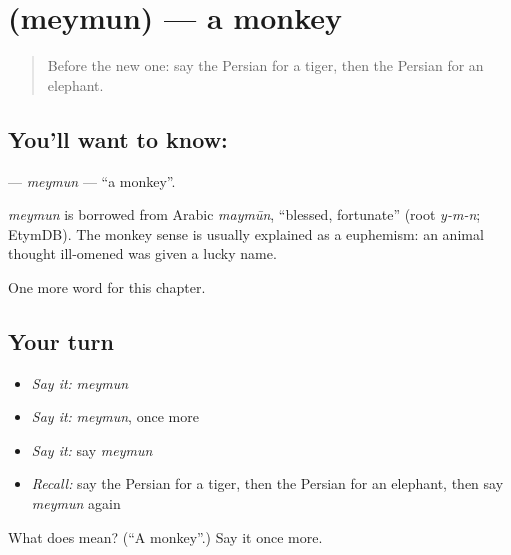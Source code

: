 \section[\texorpdfstring{\fa{میمون} (meymun)}{میمون (meymun)}]{ (meymun) — a monkey}

\label{lesson:FA-C56-meymun}



\begin{quote}
Before the new one: say the Persian for a tiger, then the Persian for an elephant.
\end{quote}

\subsection*{You'll want to know: }
\textbf{} — \emph{meymun} — \textquotedblleft{}a monkey\textquotedblright{}.

\begin{cousinweb}
\emph{meymun} is borrowed from Arabic \emph{maymūn}, \textquotedblleft{}blessed, fortunate\textquotedblright{} (root \emph{y-m-n}; EtymDB). The monkey sense is usually explained as a euphemism: an animal thought ill-omened was given a lucky name.
\end{cousinweb}

\begin{grammarlens}[title={What you've built}]
One more word for this chapter.
\end{grammarlens}

\subsection*{Your turn}
\begin{itemize}
\raggedright
  \item \emph{Say it:} \emph{meymun}
  \item \emph{Say it:} \emph{meymun}, once more
  \item \emph{Say it:} say \emph{meymun}
  \item \emph{Recall:} say the Persian for a tiger, then the Persian for an elephant, then say \emph{meymun} again
\end{itemize}

\begin{tcolorbox}[breakable,colback=teal!4,colframe=teal!35!black,title={Before you move on}]
What does  mean? (\textquotedblleft{}A monkey\textquotedblright{}.) Say it once more.
\end{tcolorbox}
